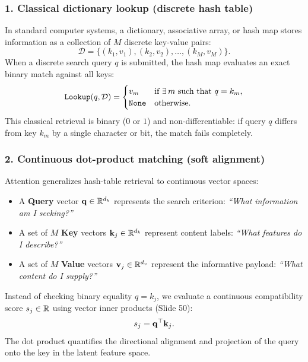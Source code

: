 \documentclass[../../main.tex]{subfiles}
\begin{document}
\subsubsection{1. Classical dictionary lookup (discrete hash table)}
In standard computer systems, a dictionary, associative array, or hash map stores information as a collection of $M$ discrete key-value pairs:
\begin{equation}
\label{eq:discrete_dict_def}
\mathcal{D} = \{ (k_1, v_1), (k_2, v_2), \dots, (k_M, v_M) \}.
\end{equation}
When a discrete search query $q$ is submitted, the hash map evaluates an exact binary match against all keys:
\begin{equation}
\label{eq:discrete_lookup_op}
\text{\texttt{Lookup}}(q, \mathcal{D}) = \begin{cases}
v_m & \text{if } \exists\, m \text{ such that } q = k_m, \\
\text{\texttt{None}} & \text{otherwise}.
\end{cases}
\end{equation}
This classical retrieval is binary ($0$ or $1$) and non-differentiable: if query $q$ differs from key $k_m$ by a single character or bit, the match fails completely.

\subsubsection{2. Continuous dot-product matching (soft alignment)}
Attention generalizes hash-table retrieval to continuous vector spaces:
\begin{itemize}
    \item A \textbf{Query} vector $\mathbf{q} \in \mathbb{R}^{d_k}$ represents the search criterion: \emph{``What information am I seeking?''}
    \item A set of $M$ \textbf{Key} vectors $\mathbf{k}_j \in \mathbb{R}^{d_k}$ represent content labels: \emph{``What features do I describe?''}
    \item A set of $M$ \textbf{Value} vectors $\mathbf{v}_j \in \mathbb{R}^{d_v}$ represent the informative payload: \emph{``What content do I supply?''}
\end{itemize}
Instead of checking binary equality $q = k_j$, we evaluate a continuous compatibility score $s_j \in \mathbb{R}$ using vector inner products (Slide 50):
\begin{equation}
\label{eq:raw_dot_product_score}
s_j = \mathbf{q}^\top \mathbf{k}_j.
\end{equation}
The dot product quantifies the directional alignment and projection of the query onto the key in the latent feature space.
\end{document}
